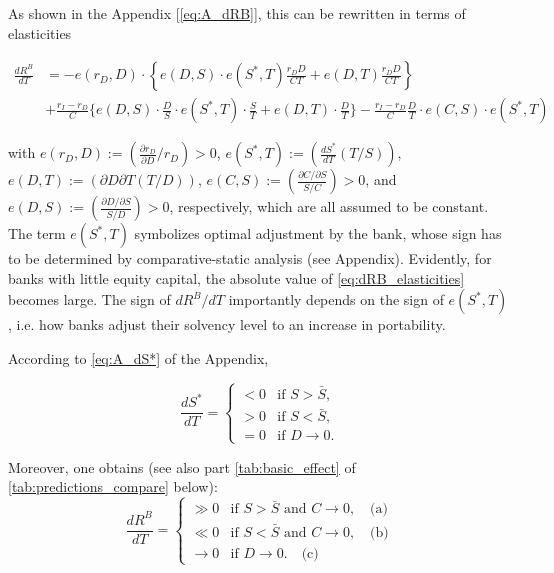 \noindent As shown in the Appendix [\autoref{eq:A_dRB}], this can be rewritten in terms of elasticities 

\small
\begin{align}
    \frac{dR^B}{dT} &= 
    -e(r_D, D) \cdot \left\{ 
        e(D, S) \cdot e(S^*, T) \frac{r_D D}{CT} 
        + e(D, T) \frac{r_D D}{CT} 
    \right\} \nonumber\\
    &+ \frac{r_I - r_D}{C} \bigg\{ 
        e(D, S) \cdot \frac{D}{S} \cdot e(S^*, T)\cdot \frac{S}{T} 
        + e(D, T) \cdot \frac{D}{T} 
    \bigg\} 
    - \frac{r_I - r_D}{C} \frac{D}{T} \cdot e(C, S) \cdot e(S^*, T) \label{eq:dRB_elasticities}
\end{align}
\normalsize

\noindent with $e(r_D, D) := \left( \frac{\partial r_D}{\partial D} / r_D \right) > 0$, $e(S^*, T) := \left( \frac{dS^*}{dT} (T / S) \right)$, $e(D, T) := \left( \partial D \partial T (T / D) \right)$, $e(C, S) := \left( \frac{\partial C / \partial S}{S / C} \right) > 0$, and $e(D, S) := \left( \frac{\partial D / \partial S}{S / D} \right) > 0$, respectively, which are all assumed to be constant. The term $e(S^*,T)$ symbolizes optimal adjustment by the bank, whose sign has to be determined by comparative-static analysis (see Appendix). Evidently, for banks with little equity capital, the absolute value of \autoref{eq:dRB_elasticities} becomes large.  The sign of $dR^B / dT$ importantly depends on the sign of $e(S^*,T)$, i.e. how banks adjust their solvency level to an increase in portability. 

According to \autoref{eq:A_dS*} of the Appendix,

\begin{equation}
    \frac{dS^*}{dT} =
    \begin{cases} 
        < 0 & \text{if } S > \bar{S}, \\
        > 0 & \text{if } S < \bar{S}, \\
        = 0 & \text{if } D \to 0. \label{eq:dS*}
    \end{cases}
\end{equation}

\noindent Moreover, one obtains (see also part \ref{tab:basic_effect} of \autoref{tab:predictions_compare} below):
\begin{equation}\label{eq:dRB_cases1}
    \frac{dR^B}{dT} =
    \begin{cases} 
        \gg 0 & \text{if } S > \bar{S} \text{ and } C \to 0, \quad \text{(a)}\\
        \ll 0 & \text{if } S < \bar{S} \text{ and } C \to 0, \quad \text{(b)}\\
        \to 0 & \text{if } D \to 0. \quad \text{(c)}
    \end{cases} 
\end{equation}




